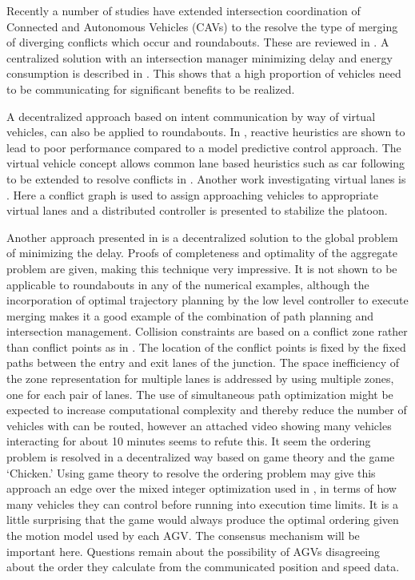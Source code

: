 Recently a number of studies have extended intersection coordination of Connected and Autonomous Vehicles (CAVs) to the resolve the type of merging of diverging conflicts which occur and roundabouts. These are reviewed in \cite{Rios-Torres2017}. A centralized solution with an intersection manager minimizing delay and energy consumption is described in \cite{Zhao2018}. This shows that a high proportion of vehicles need to be communicating for significant benefits to be realized. 

A decentralized approach based on intent communication by way of virtual vehicles, can also be applied to roundabouts. In \cite{Debada2016}, reactive heuristics are shown to lead to poor performance compared to a model predictive control approach. The virtual vehicle concept allows common lane based heuristics such as car following to be extended to resolve conflicts in  \cite{Debada2018}. Another work investigating virtual lanes is \cite{Xu2018}. Here a conflict graph is used to assign approaching vehicles to appropriate virtual lanes and a distributed controller is presented to stabilize the platoon.

Another approach presented in \cite{Liu2018} is a decentralized solution to the global problem of minimizing the delay. Proofs of completeness and optimality of the aggregate problem are given, making this technique very impressive. It is not shown to be applicable to roundabouts in any of the numerical examples, although the incorporation of optimal trajectory planning by the low level controller to execute merging makes it a good example of the combination of path planning and intersection management. Collision constraints are based on a conflict zone rather than conflict points as in \cite{Levin2017}. The location of the conflict points is fixed by the fixed paths between the entry and exit lanes of the junction. The space inefficiency of the zone representation for multiple lanes is addressed by using multiple zones, one for each pair of lanes. The use of simultaneous path optimization might be expected to increase computational complexity and thereby reduce the number of vehicles with can be routed, however an attached video showing many vehicles interacting for about 10 minutes seems to refute this. It seem the ordering problem is resolved in a decentralized way based on game theory and the game `Chicken.' Using game theory to resolve the ordering problem may give this approach an edge over the mixed integer optimization used in \cite{Levin2017}, in terms of how many vehicles they can control before running into execution time limits. It is a little surprising that the game would always produce the optimal ordering given the motion model used by each AGV. The consensus mechanism will be important here. Questions remain about the possibility of AGVs disagreeing about the order they calculate from the communicated position and speed data. 

